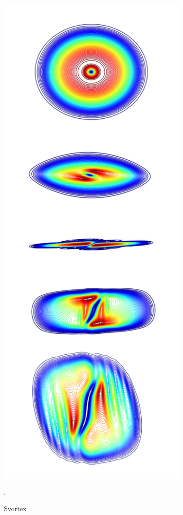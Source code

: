\begin{figure}\centering
    \includegraphics[angle=90,width=0.85\textwidth]{Images/ch4_vtx/velocity/cos_plane_ev}
    \caption{Svortex}.\label{fig:svortex}
\end{figure}

